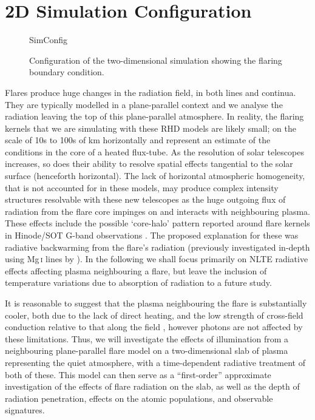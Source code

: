 \section{2D Simulation Configuration}

\begin{figure}
\centering
{SimConfig}
\caption{Configuration of the two-dimensional simulation showing the flaring boundary condition.}
\label{Fig:2DSimConfig}
\end{figure}

Flares produce huge changes in the radiation field, in both lines and continua.
They are typically modelled in a plane-parallel context and we analyse the radiation leaving the top of this plane-parallel atmosphere.
In reality, the flaring kernels that we are simulating with these RHD models are likely small; on the scale of 10s to 100s of \si{\kilo\metre} horizontally and represent an estimate of the conditions in the core of a heated flux-tube.
As the resolution of solar telescopes increases, so does their ability to resolve spatial effects tangential to the solar surface (henceforth horizontal).
The lack of horizontal atmospheric homogeneity, that is not accounted for in these models, may produce complex intensity structures resolvable with these new telescopes as the huge outgoing flux of radiation from the flare core impinges on and interacts with neighbouring plasma.
These effects include the possible `core-halo' pattern reported around flare kernels in Hinode/SOT G-band observations \citep{Isobe2007}.
The proposed explanation for these was radiative backwarming from the flare's radiation (previously investigated in-depth using Mg\,\textsc{i} lines by \citet{Metcalf1990}).
In the following we shall focus primarily on NLTE radiative effects affecting plasma neighbouring a flare, but leave the inclusion of temperature variations due to absorption of radiation to a future study.

It is reasonable to suggest that the plasma neighbouring the flare is substantially cooler, both due to the lack of direct heating, and the low strength of cross-field conduction relative to that along the field \citep{Spitzer1953}, however photons are not affected by these limitations.
Thus, we will investigate the effects of illumination from a neighbouring plane-parallel flare model on a two-dimensional slab of plasma representing the quiet atmosphere, with a time-dependent radiative treatment of both of these.
This model can then serve as a ``first-order'' approximate investigation of the effects of flare radiation on the slab, as well as the depth of radiation penetration, effects on the atomic populations, and observable signatures.

